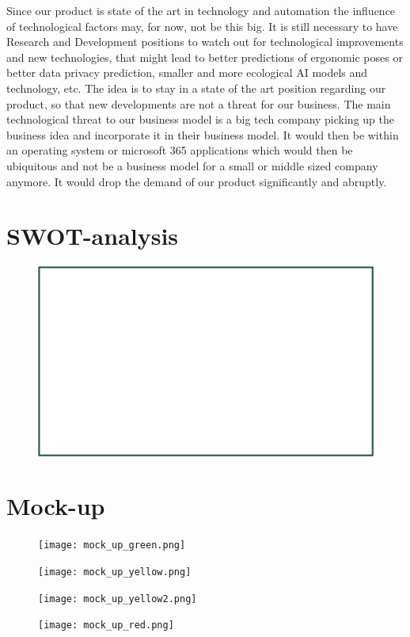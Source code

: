 Since our product is state of the art in technology and automation the influence of technological factors may, for now, not be this big. It is still necessary to have Research and Development positions to watch out for technological improvements and new technologies, that might lead to better predictions of ergonomic poses or better data privacy prediction, smaller and more ecological AI models and technology, etc. The idea is to stay in a state of the art position regarding our product, so that new developments are not a threat for our business.
The main technological threat to our business model is a big tech company picking up the business idea and incorporate it in their business model. It would then be within an operating system or microsoft 365 applications which would then be ubiquitous and not be a business model for a small or middle sized company anymore. It would drop the demand of our product significantly and abruptly. 

\section{SWOT-analysis}

\begin{figure}[h]
    \includegraphics[width=17.5cm]{SWOT_analysis.png}
\end{figure}

\section{Mock-up}

\begin{figure}[h]
    \texttt{[image: mock\_up\_green.png]}
\end{figure}

\begin{figure}[h]
    \texttt{[image: mock\_up\_yellow.png]}
\end{figure}

\begin{figure}[h]
    \texttt{[image: mock\_up\_yellow2.png]}
\end{figure}

\begin{figure}[h]
    \texttt{[image: mock\_up\_red.png]}
\end{figure}